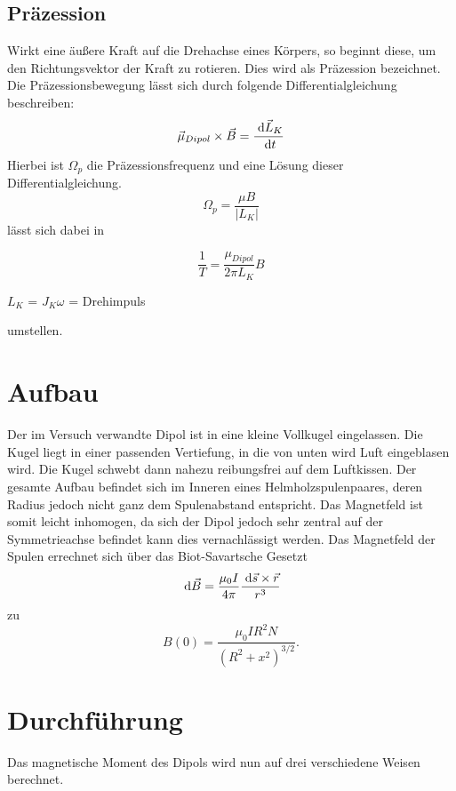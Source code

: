   \subsection{Präzession}
 Wirkt eine äußere Kraft auf die Drehachse eines Körpers, so beginnt diese, um den Richtungsvektor der Kraft zu rotieren. Dies wird als Präzession bezeichnet.
Die Präzessionsbewegung lässt sich durch folgende Differentialgleichung beschreiben:
\begin{equation}
\vec{\mu}_{Dipol} \times \vec{B} = \frac{\; \mathrm{d} \vec{L}_K}{\; \mathrm{d} t}
\end{equation}
Hierbei ist $\Omega_p$ die Präzessionsfrequenz und eine Lösung dieser Differentialgleichung.
\begin{equation}
\Omega_p = \frac{\mu B}{|L_K|}
\end{equation}
lässt sich dabei in
\begin{formel}[H]
\begin{equation}
\frac{1}{T} = \frac{\mu_{Dipol}}{2 \pi L_K} B
\label{prae}
\end{equation}
\caption*{\small{$L_K$ = $J_K \omega$ = Drehimpuls}}
\end{formel}
umstellen.
\section{Aufbau}
Der im Versuch verwandte Dipol ist in eine kleine Vollkugel eingelassen. Die Kugel liegt in einer passenden Vertiefung, in die von unten wird Luft eingeblasen wird. Die Kugel schwebt dann nahezu reibungsfrei auf dem Luftkissen.
Der gesamte Aufbau befindet sich im Inneren eines Helmholzspulenpaares, deren Radius jedoch nicht ganz dem Spulenabstand entspricht. Das Magnetfeld ist somit leicht inhomogen, da sich der Dipol jedoch sehr zentral auf der Symmetrieachse befindet kann dies vernachlässigt werden.
Das Magnetfeld der Spulen errechnet sich über das Biot-Savartsche Gesetzt
\begin{equation}
\; \mathrm{d} \vec{B} = \frac{\mu_0 I}{4\pi} \frac{\; \mathrm{d} \vec{s} \times \vec{r}}{r^3}
\end{equation} 
zu
\begin{equation}
B(0)=\frac{\mu_0 IR^2N}{(R^2+x^2)^{3/2}}.
\label{eqhelm}
\end{equation}

\section{Durchführung}
Das magnetische Moment des Dipols wird nun auf drei verschiedene Weisen berechnet.

